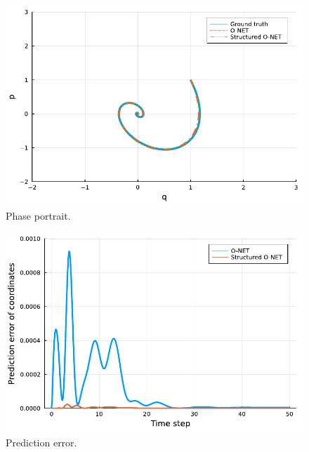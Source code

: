 \documentclass[
	parskip, 			   %
	twoside, 			   %
	DIV=14, 			   %
	BCOR=15.0mm, 		   %
	headsepline, 		   %
	open=right, 		   %
	captions=tableheading, %
	bibliography=totoc,    %
	numbers=noenddot       %
]{scrreprt}
\begin{document}
\clearpage
\begin{figure}[h!]
    \centering
    \includegraphics[scale=1]{figures/phase_portrait_O_NET_idho.pdf}
    \caption{Phase portrait.}
    \label{fig:phase_portrait_O_NET_idho}
\end{figure}

\begin{figure}[h!]
    \centering
    \includegraphics[scale=1]{figures/prediction_error_structured_O_NET_idho.pdf}
    \caption{Prediction error.}
    \label{fig:prediction_error_structured_O_NET_idho}
\end{figure}
\end{document}
